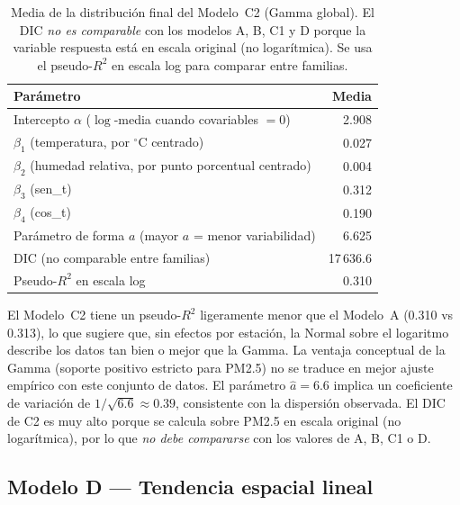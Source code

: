 ﻿\documentclass[12pt]{article}
\begin{document}
\begin{table}[H]
\centering
\caption{Media de la distribuci\'on final del Modelo~C2 (Gamma global).
         El DIC \emph{no es comparable} con los modelos A, B, C1 y D
         porque la variable respuesta est\'a en escala original
         (no logar\'itmica).
         Se usa el pseudo-$R^2$ en escala log para comparar entre familias.}
\label{tab:modC2}
\begin{tabular}{>{\raggedright\arraybackslash}p{8.5cm}r}
\toprule
Par\'ametro & Media \\
\midrule
Intercepto $\alpha$ ($\log$-media cuando covariables $= 0$)    & 2.908 \\
$\beta_1$ (temperatura, por $^\circ$C centrado)                & 0.027 \\
$\beta_2$ (humedad relativa, por punto porcentual centrado)    & 0.004 \\
$\beta_3$ (sen\_t)                                             & 0.312 \\
$\beta_4$ (cos\_t)                                             & 0.190 \\
Par\'ametro de forma $a$ (mayor $a$ = menor variabilidad)      & 6.625 \\
\midrule
DIC (no comparable entre familias)                             & 17\,636.6 \\
Pseudo-$R^2$ en escala log                                     & 0.310 \\
\bottomrule
\end{tabular}
\end{table}

El Modelo~C2 tiene un pseudo-$R^2$ ligeramente menor que el Modelo~A
(0.310 vs 0.313), lo que sugiere que, sin efectos por estaci\'on, la
Normal sobre el logaritmo describe los datos tan bien o mejor que la Gamma.
La ventaja conceptual de la Gamma (soporte positivo estricto para PM2.5)
no se traduce en mejor ajuste emp\'irico con este conjunto de datos.
El par\'ametro $\hat a = 6.6$ implica un coeficiente de variaci\'on de
$1/\sqrt{6.6} \approx 0.39$, consistente con la dispersi\'on observada.
El DIC de C2 es muy alto porque se calcula sobre PM2.5 en escala original
(no logarítmica), por lo que \emph{no debe compararse} con los valores
de A, B, C1 o D.


\subsection{Modelo D --- Tendencia espacial lineal}
\end{document}
